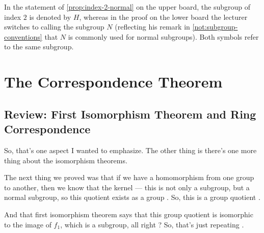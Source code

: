 \begin{proofWrapper}
\begin{aiNote}
In the statement of \cref{prop:index-2-normal} on the upper board, the subgroup of index $2$ is denoted by $H$, whereas in the proof on the lower board the lecturer switches to calling the subgroup $N$ (reflecting his remark in \cref{not:subgroup-conventions} that $N$ is commonly used for normal subgroups). Both symbols refer to the same subgroup.
\end{aiNote}

\end{proofWrapper}

\begin{hidden}
\end{hidden}

\section{The Correspondence Theorem}

\subsection{Review: First Isomorphism Theorem and Ring Correspondence}

\begin{speech}[00:13:20 - 00:14:14]
So, that's one aspect I wanted to emphasize. The other thing is there's one more thing about the isomorphism theorems.

The next thing we proved was that if we have a homomorphism from one group to another, then we know that the kernel --- this is not only a subgroup, but a normal subgroup, so this quotient exists as a group . So, this is a group quotient .

And that first isomorphism theorem says that this group quotient is isomorphic to the image of $f_1$, which is a subgroup, all right ? So, that's just repeating .
\end{speech}

